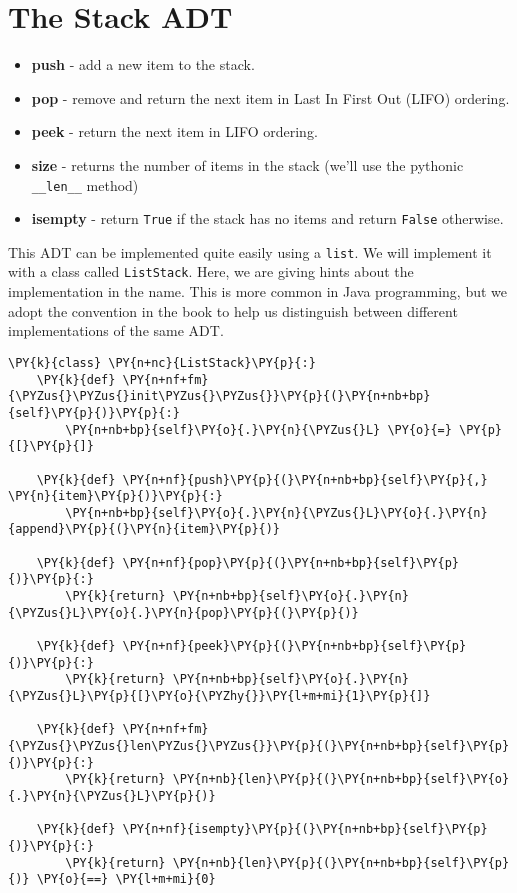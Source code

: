 \section{The Stack ADT}

\begin{itemize}

\item \textbf{push} - add a new item to the stack.

\item \textbf{pop} - remove and return the next item in Last In First Out (LIFO) ordering.

\item \textbf{peek} - return the next item in LIFO ordering.

\item \textbf{size} - returns the number of items in the stack (we'll use the pythonic \texttt{\_\_len\_\_} method)

\item \textbf{isempty} - return \texttt{True} if the stack has no items and return \texttt{False} otherwise.

\end{itemize}

This ADT can be implemented quite easily using a \texttt{list}.
We will implement it with a class called \texttt{ListStack}.
Here, we are giving hints about the implementation in the name.
This is more common in Java programming, but we adopt the convention in the book to help us distinguish between different implementations of the same ADT.

\begin{Verbatim}[commandchars=\\\{\}]
\PY{k}{class} \PY{n+nc}{ListStack}\PY{p}{:}
    \PY{k}{def} \PY{n+nf+fm}{\PYZus{}\PYZus{}init\PYZus{}\PYZus{}}\PY{p}{(}\PY{n+nb+bp}{self}\PY{p}{)}\PY{p}{:}
        \PY{n+nb+bp}{self}\PY{o}{.}\PY{n}{\PYZus{}L} \PY{o}{=} \PY{p}{[}\PY{p}{]}

    \PY{k}{def} \PY{n+nf}{push}\PY{p}{(}\PY{n+nb+bp}{self}\PY{p}{,} \PY{n}{item}\PY{p}{)}\PY{p}{:}
        \PY{n+nb+bp}{self}\PY{o}{.}\PY{n}{\PYZus{}L}\PY{o}{.}\PY{n}{append}\PY{p}{(}\PY{n}{item}\PY{p}{)}

    \PY{k}{def} \PY{n+nf}{pop}\PY{p}{(}\PY{n+nb+bp}{self}\PY{p}{)}\PY{p}{:}
        \PY{k}{return} \PY{n+nb+bp}{self}\PY{o}{.}\PY{n}{\PYZus{}L}\PY{o}{.}\PY{n}{pop}\PY{p}{(}\PY{p}{)}

    \PY{k}{def} \PY{n+nf}{peek}\PY{p}{(}\PY{n+nb+bp}{self}\PY{p}{)}\PY{p}{:}
        \PY{k}{return} \PY{n+nb+bp}{self}\PY{o}{.}\PY{n}{\PYZus{}L}\PY{p}{[}\PY{o}{\PYZhy{}}\PY{l+m+mi}{1}\PY{p}{]}

    \PY{k}{def} \PY{n+nf+fm}{\PYZus{}\PYZus{}len\PYZus{}\PYZus{}}\PY{p}{(}\PY{n+nb+bp}{self}\PY{p}{)}\PY{p}{:}
        \PY{k}{return} \PY{n+nb}{len}\PY{p}{(}\PY{n+nb+bp}{self}\PY{o}{.}\PY{n}{\PYZus{}L}\PY{p}{)}

    \PY{k}{def} \PY{n+nf}{isempty}\PY{p}{(}\PY{n+nb+bp}{self}\PY{p}{)}\PY{p}{:}
        \PY{k}{return} \PY{n+nb}{len}\PY{p}{(}\PY{n+nb+bp}{self}\PY{p}{)} \PY{o}{==} \PY{l+m+mi}{0}
\end{Verbatim}



